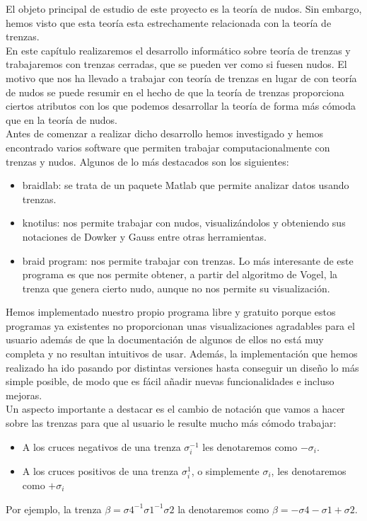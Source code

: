 El objeto principal de estudio de este proyecto es la teoría de nudos. Sin embargo, hemos visto que esta teoría esta estrechamente relacionada con la teoría de trenzas.\\

En este capítulo realizaremos el desarrollo informático sobre teoría de trenzas y trabajaremos con trenzas cerradas, que se pueden ver como si fuesen nudos. El motivo que nos ha llevado a trabajar con teoría de trenzas en lugar de con teoría de nudos se puede resumir en el hecho de que la teoría de trenzas proporciona ciertos atributos con los que podemos desarrollar la teoría de forma más cómoda que en la teoría de nudos. \\

Antes de comenzar a realizar dicho desarrollo hemos investigado y hemos encontrado varios software que permiten trabajar computacionalmente con trenzas y nudos. Algunos de lo más destacados son los siguientes:
\begin{itemize}
	\item braidlab: se trata de un paquete Matlab que permite analizar datos usando trenzas. 
	\item knotilus: nos permite trabajar con nudos, visualizándolos y obteniendo sus notaciones de Dowker y Gauss entre otras herramientas.
	\item braid program: nos permite trabajar con trenzas. Lo más interesante de este programa es que nos permite obtener, a partir del algoritmo de Vogel, la trenza que genera cierto nudo, aunque no nos permite su visualización. 
\end{itemize}

Hemos implementado nuestro propio programa libre y gratuito porque estos programas ya existentes no proporcionan unas visualizaciones agradables para el usuario además de que la documentación de algunos de ellos no está muy completa y no resultan intuitivos de usar. Además, la implementación que hemos realizado ha ido pasando por distintas versiones hasta conseguir un diseño lo más simple posible, de modo que es fácil añadir nuevas funcionalidades e incluso mejoras. \\

Un aspecto importante a destacar es el cambio de notación que vamos a hacer sobre las trenzas para que al usuario le resulte mucho más cómodo trabajar:
\begin{itemize}
	\item A los cruces negativos de una trenza $ \sigma_{i}^{-1} $ les denotaremos como $ -\sigma_{i}$.
	\item A los cruces positivos de una trenza $ \sigma_{i}^{1} $, o simplemente $ \sigma_{i} $, les denotaremos como $ +\sigma_{i} $
\end{itemize}

Por ejemplo, la trenza $\beta = \sigma4^{-1}\sigma1^{-1}\sigma2$ la denotaremos como $\beta = -\sigma4-\sigma1+\sigma2$.\\ 

